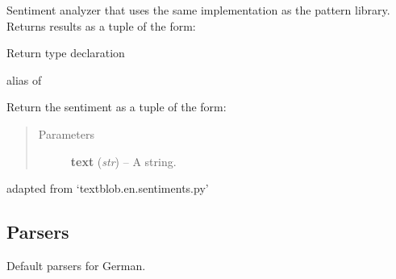 \documentclass[letterpaper,10pt,english]{sphinxmanual}
\begin{document}
\begin{fulllineitems}
\label{api_reference:textblob_de.sentiments.PatternAnalyzer}
Sentiment analyzer that uses the same implementation as the
pattern library. Returns results as a tuple of the form:


\begin{fulllineitems}
\label{api_reference:textblob_de.sentiments.PatternAnalyzer.RETURN_TYPE}
Return type declaration

alias of 

\end{fulllineitems}


\begin{fulllineitems}
\label{api_reference:textblob_de.sentiments.PatternAnalyzer.analyze}
Return the sentiment as a tuple of the form:
\begin{quote}\begin{description}
\item[{Parameters}] \leavevmode
\textbf{text} (\emph{str}) -- A string.

\end{description}\end{quote}

\end{fulllineitems}


\begin{fulllineitems}
\label{api_reference:textblob_de.sentiments.PatternAnalyzer.kind}
adapted from `textblob.en.sentiments.py'

\end{fulllineitems}


\end{fulllineitems}



\subsection{Parsers}
\label{api_reference:parsers}\label{api_reference:module-textblob_de.parsers}
Default parsers for German.
\end{document}
